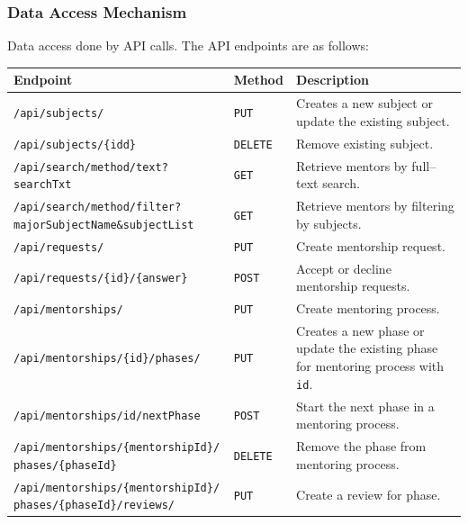 \documentclass[10pt]{article}
\begin{document}
\subsubsection{Data Access Mechanism} \label{data_access_mechanism}
Data access done by API calls. The API endpoints are as follows:
\begin{table}[h]
    \centering
    \begin{tabularx}{\textwidth}{|l|l|X|} \hline
        \textbf{Endpoint} & \textbf{Method} & \textbf{Description} \\ \hline
        \texttt{/api/subjects/} & \texttt{PUT} & Creates a new subject or update the existing subject.\\ \hline
        \texttt{/api/subjects/\{idd\}} & \texttt{DELETE} & Remove existing subject.\\ \hline
        \texttt{/api/search/method/text?searchTxt} & \texttt{GET} & Retrieve mentors by full--text search.\\ \hline
        \makecell[l]{\texttt{/api/search/method/filter?} \\ \quad\texttt{majorSubjectName\&subjectList}} & \texttt{GET} & Retrieve mentors by filtering by subjects.\\ \hline
        \texttt{/api/requests/} & \texttt{PUT} & Create mentorship request.\\ \hline
        \texttt{/api/requests/\{id\}/\{answer\}} & \texttt{POST} & Accept or decline mentorship requests.\\ \hline
        \texttt{/api/mentorships/} & \texttt{PUT} & Create mentoring process.\\ \hline
        \texttt{/api/mentorships/\{id\}/phases/} & \texttt{PUT} & Creates a new phase or update the existing phase for mentoring process with \texttt{id}.\\ \hline
        \texttt{/api/mentorships/{id}/nextPhase} & \texttt{POST} & Start the next phase in a mentoring process.\\ \hline
        \makecell[l]{\texttt{/api/mentorships/\{mentorshipId\}/} \\ \quad\texttt{phases/\{phaseId\}}} & \texttt{DELETE} & Remove the phase from mentoring process.\\ \hline
        \makecell[l]{\texttt{/api/mentorships/\{mentorshipId\}/} \\ \quad\texttt{phases/\{phaseId\}/reviews/}} & \texttt{PUT} & Create a review for phase.\\ \hline
    \end{tabularx}
    \label{tab:apis}
\end{table}
\end{document}
